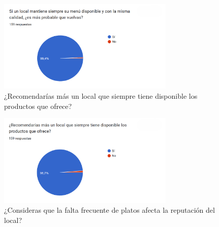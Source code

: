 \begin{figure}[!htbp]
  \centering
  \includegraphics[width=0.75\textwidth]{images/pregunta7.png}
  \caption{¿Recomendarías más un local que siempre tiene disponible los productos que ofrece?}
  \label{fig:anexo-p7}
\end{figure}

\begin{figure}[!htbp]
  \centering
  \includegraphics[width=0.75\textwidth]{images/pregunta8.png}
  \caption{¿Consideras que la falta frecuente de platos afecta la reputación del local?}
  \label{fig:anexo-p8}
\end{figure}

\FloatBarrier
